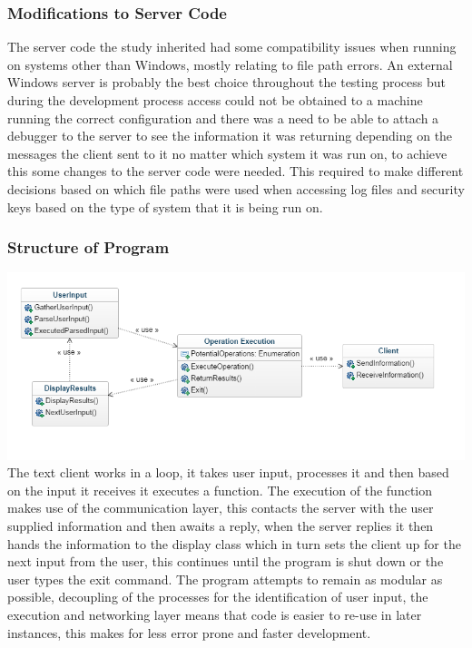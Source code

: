 \documentclass{article}
\begin{document}
\subsubsection{Modifications to Server Code}
The server code the study inherited had some compatibility issues when running on systems other than Windows, mostly relating to file path errors. An external Windows server is probably the best choice throughout the testing process but during the development process access could not be obtained to a machine running the correct configuration and there was a need to be able to attach a debugger to the server to see the information it was returning depending on the messages the client sent to it no matter which system it was run on, to achieve this some changes to the server code were needed. This required to make different decisions based on which file paths were used when accessing log files and security keys based on the type of system that it is being run on.
\subsubsection{Structure of Program}
\includegraphics[width=\textwidth]{textclient.png}\\
 The text client works in a loop, it takes user input, processes it and then based on the input it receives it executes a function. The execution of the function makes use of the communication layer, this contacts the server with the user supplied information and then awaits a reply, when the server replies it then hands the information to the display class which in turn sets the client up for the next input from the user, this continues until the program is shut down or the user types the exit command. The program attempts to remain as modular as possible, decoupling of the processes for the identification of user input, the execution and networking layer means that code is easier to re-use in later instances, this makes for less error prone and faster development.
\end{document}
